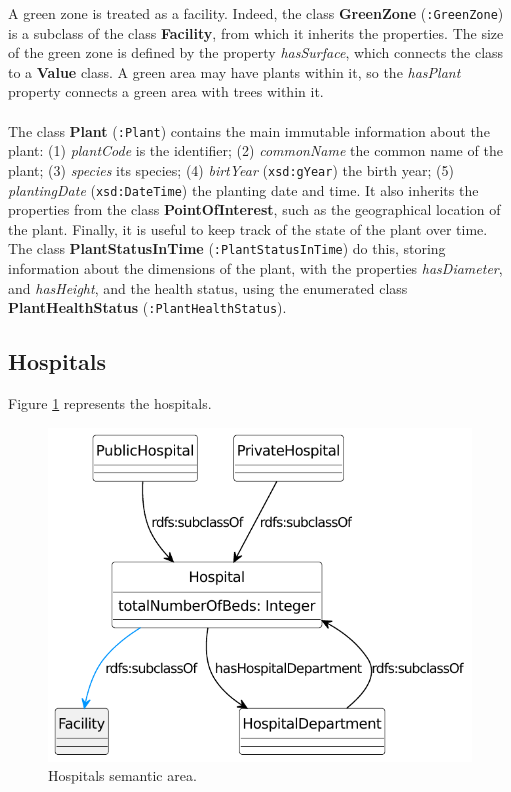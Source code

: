 A green zone is treated as a facility. Indeed, the class \textbf{GreenZone} (\verb#:GreenZone#) is a subclass of the class \textbf{Facility}, from which it inherits the properties. The size of the green zone is defined by the property \textit{hasSurface}, which connects the class to a \textbf{Value} class. A green area may have plants within it, so the \textit{hasPlant} property connects a green area with trees within it.

\paragraph*{}
The class \textbf{Plant} (\verb#:Plant#) contains the main immutable information about the plant: (1) \textit{plantCode} is the identifier; (2) \textit{commonName} the common name of the plant; (3) \textit{species} its species; (4) \textit{birtYear} (\verb#xsd:gYear#) the birth year; (5) \textit{plantingDate} (\verb#xsd:DateTime#) the planting date and time. It also inherits the properties from the class \textbf{PointOfInterest}, such as the geographical location of the plant.
Finally, it is useful to keep track of the state of the plant over time. The class \textbf{PlantStatusInTime} (\verb#:PlantStatusInTime#) do this, storing information about the dimensions of the plant, with the properties \textit{hasDiameter}, and \textit{hasHeight}, and the health status, using the enumerated class \textbf{PlantHealthStatus} (\verb#:PlantHealthStatus#).

\subsection{Hospitals}
\label{subsec:hospitals}

Figure \ref{fig:hospitals-sa} represents the hospitals.

\begin{figure}[!ht]
  \centering
  \includegraphics[width=0.5\columnwidth]{images/ontoim/hospitals}
  \caption{Hospitals semantic area.}
  \label{fig:hospitals-sa}
\end{figure}

